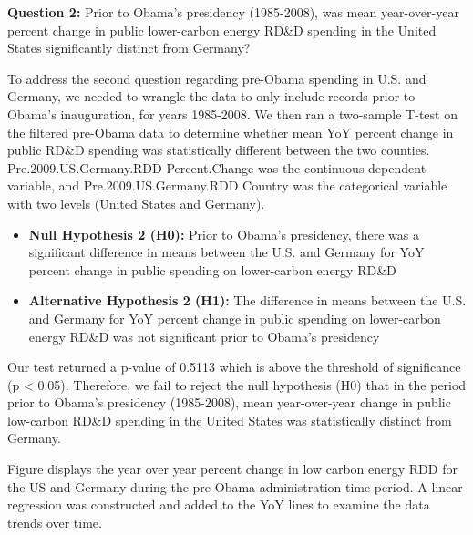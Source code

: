\documentclass[
  12pt,
]{article}
\begin{document}
\textbf{Question 2:} Prior to Obama's presidency (1985-2008), was mean
year-over-year percent change in public lower-carbon energy RD\&D
spending in the United States significantly distinct from Germany?

To address the second question regarding pre-Obama spending in U.S. and
Germany, we needed to wrangle the data to only include records prior to
Obama's inauguration, for years 1985-2008. We then ran a two-sample
T-test on the filtered pre-Obama data to determine whether mean YoY
percent change in public RD\&D spending was statistically different
between the two counties. Pre.2009.US.Germany.RDD Percent.Change was the
continuous dependent variable, and Pre.2009.US.Germany.RDD Country was
the categorical variable with two levels (United States and Germany).

\begin{itemize}
\item
  \textbf{Null Hypothesis 2 (H0):} Prior to Obama's presidency, there
  was a significant difference in means between the U.S. and Germany for
  YoY percent change in public spending on lower-carbon energy RD\&D
\item
  \textbf{Alternative Hypothesis 2 (H1):} The difference in means
  between the U.S. and Germany for YoY percent change in public spending
  on lower-carbon energy RD\&D was not significant prior to Obama's
  presidency
\end{itemize}

Our test returned a p-value of 0.5113 which is above the threshold of
significance (p \textless{} 0.05). Therefore, we fail to reject the null
hypothesis (H0) that in the period prior to Obama's presidency
(1985-2008), mean year-over-year change in public low-carbon RD\&D
spending in the United States was statistically distinct from Germany.

Figure displays the year over year percent change in low carbon energy
RDD for the US and Germany during the pre-Obama administration time
period. A linear regression was constructed and added to the YoY lines
to examine the data trends over time.
\end{document}
